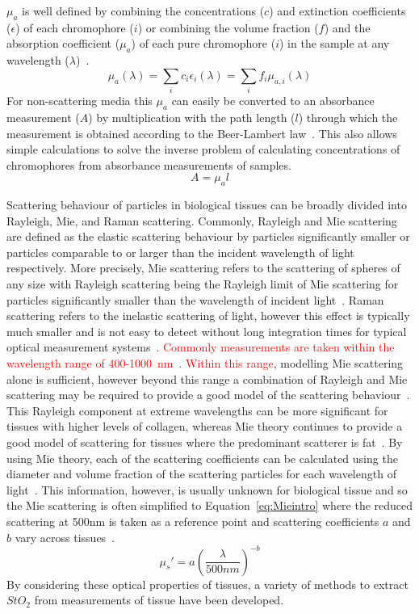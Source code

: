 $\mu_a$ is well defined by combining the concentrations ($c$) and extinction coefficients ($\epsilon$) of each chromophore ($i$) or combining the volume fraction ($f$) and the absorption coefficient ($\mu_a$) of each pure chromophore ($i$) in the sample at any wavelength ($\lambda$)~\citep{Jacques2013, MacKenzie2018}. 
\begin{equation}
    \mu_a(\lambda) = \sum_i c_i \epsilon_i(\lambda) = \sum_i f_i \mu_{a, i}(\lambda)
    \label{eq:definemua}
\end{equation}
For non-scattering media this $\mu_a$ can easily be converted to an absorbance measurement ($A$) by multiplication with the path length ($l$) through which the measurement is obtained according to the Beer-Lambert law~\citep{MacKenzie2018}. This also allows simple calculations to solve the inverse problem of calculating concentrations of chromophores from absorbance measurements of samples. 
\begin{equation}
    A = \mu_al
\end{equation}

Scattering behaviour of particles in biological tissues can be broadly divided into Rayleigh, Mie, and Raman scattering. Commonly, Rayleigh and Mie scattering are defined as the elastic scattering behaviour by particles significantly smaller or particles comparable to or larger than the incident wavelength of light respectively. More precisely, Mie scattering refers to the scattering of spheres of any size with Rayleigh scattering being the Rayleigh limit of Mie scattering for particles significantly smaller than the wavelength of incident light~\citep{Jacques2013}. Raman scattering refers to the inelastic scattering of light, however this effect is typically much smaller and is not easy to detect without long integration times for typical optical measurement systems~\citep{Kong2015}.  \textcolor{red}{Commonly measurements are taken within the wavelength range of 400-1000~nm~\citep{Jacques2013}. Within this range}, modelling Mie scattering alone is sufficient, however beyond this range a combination of Rayleigh and Mie scattering may be required to provide a good model of the scattering behaviour~\citep{Jacques2013}. This Rayleigh component at extreme wavelengths can be more significant for tissues with higher levels of collagen, whereas Mie theory continues to provide a good model of scattering for tissues where the predominant scatterer is fat~\citep{Jacques2013}. By using Mie theory, each of the scattering coefficients can be calculated using the diameter and volume fraction of the scattering particles for each wavelength of light~\citep{Hergert2012}. This information, however, is usually unknown for biological tissue and so the Mie scattering is often simplified to Equation~\eqref{eq:Mieintro} where the reduced scattering at 500nm is taken as a reference point and scattering coefficients $a$ and $b$ vary across tissues~\citep{Jacques2013}. 
\begin{equation}
    \mu_s' = a(\frac{\lambda}{500nm})^{-b}
    \label{eq:Mieintro}
\end{equation}
By considering these optical properties of tissues, a variety of methods to extract $StO_2$ from measurements of tissue have been developed. 


